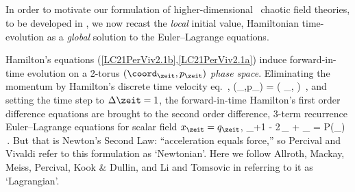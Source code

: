 \subsection{\tempLatt}
\label{s:catLagrange}
\renewcommand{\period}[1]{{\ensuremath{n_{#1}}}}

In order to motivate our formulation of higher-dimensional \spt\ chaotic
field theories, to be developed in , we now recast the
\emph{local} initial value, Hamiltonian time-evolution  as a
\emph{global} solution to the Euler–Lagrange equations.

Hamilton's equations (\ref{LC21PerViv2.1b},\ref{LC21PerViv2.1a}) induce
forward-in-time evolution on a 2-torus  $(\coord_{\zeit},p_\zeit)$ {\em
phase space}.
Eliminating the momentum by Hamilton's discrete time velocity
eq.~,
\beq
(\coord_\zeit,p_\zeit) =
\left(
    \ssp_{\zeit},
\right)
\,,
and setting the time step to $\Delta\zeit=1$, the
forward-in-time Hamilton's first order difference equations are brought
to the second order difference, 3-term recurrence Euler–Lagrange equations
for scalar field $\ssp_{\zeit}=q_\zeit$,
\beq
\ssp_{\zeit+1} - 2\,\ssp_{\zeit} + \ssp_{} = P(\ssp_{\zeit})
\,.
But that is Newton's Second Law: ``acceleration equals
force,'' so Percival and Vivaldi refer to this formulation as
`Newtonian'. Here we follow Allroth, Mackay, Meiss,
Percival, Kook \& Dullin,
and Li and Tomsovic in referring  to it as `Lagrangian'.

